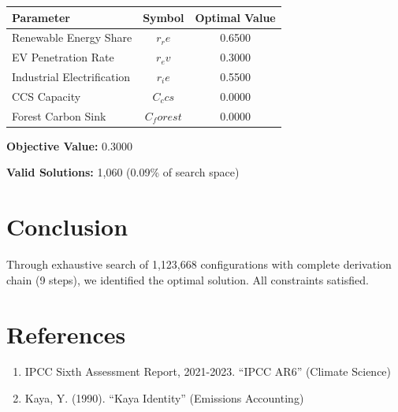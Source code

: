 \documentclass[11pt,a4paper]{article}
\begin{document}
\begin{center}
\begin{tabular}{lcc}
\hline
Parameter & Symbol & Optimal Value \\
\hline
Renewable Energy Share & $r_re$ & 0.6500 \\
EV Penetration Rate & $r_ev$ & 0.3000 \\
Industrial Electrification & $r_ie$ & 0.5500 \\
CCS Capacity & $C_ccs$ & 0.0000 \\
Forest Carbon Sink & $C_forest$ & 0.0000 \\
\hline
\end{tabular}
\end{center}

\textbf{Objective Value:} 0.3000

\textbf{Valid Solutions:} 1,060 (0.09\% of search space)

\section{Conclusion}

Through exhaustive search of 1,123,668 configurations with complete derivation chain (9 steps), we identified the optimal solution. All constraints satisfied.

\section*{References}

\begin{enumerate}
\item IPCC Sixth Assessment Report, 2021-2023. ``IPCC AR6'' (Climate Science)
\item Kaya, Y. (1990). ``Kaya Identity'' (Emissions Accounting)
\end{enumerate}
\end{document}
